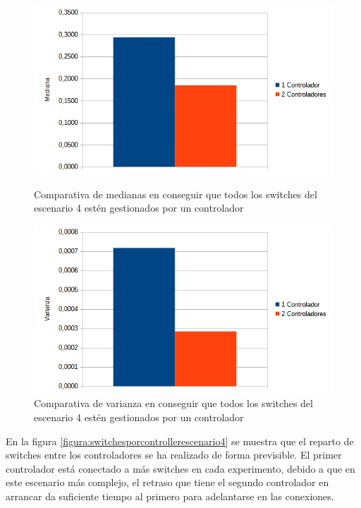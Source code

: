 \documentclass[a4paper, 12pt]{book}
\begin{document}
	\begin{figure}[H]
		\centering
		\begin{minipage}[b]{0.45\textwidth}
			\centering
			\includegraphics[width=\textwidth]{img/comparativamedianaescenario4}
			\caption{Comparativa de medianas en conseguir que todos los switches del escenario 4 estén gestionados por un controlador}
			\label{fig:medianascenario4}
		\end{minipage}
		\hfill
		\begin{minipage}[b]{0.45\textwidth}
			\centering
			\includegraphics[width=\textwidth]{img/comparativavarianzaescenario4}
			\caption{Comparativa de varianza en conseguir que todos los switches del escenario 4 estén gestionados por un controlador}
			\label{fig:varianzaescenario4}
		\end{minipage}
	\end{figure}
	
		En la figura \ref{figura:switchesporcontrollerescenario4} se muestra que el reparto de switches entre los controladores se ha realizado de forma previsible. El primer controlador está conectado a más switches en cada experimento, debido a que en este escenario más complejo, el retraso que tiene el segundo controlador en arrancar da suficiente tiempo al primero para adelantarse en las conexiones.
		
\end{document}
